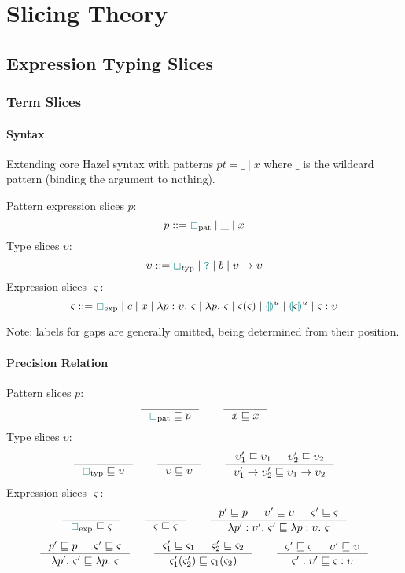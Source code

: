 \chapter{Slicing Theory}
\label{sec:SlicingTheory}
\section{Expression Typing Slices}
\subsection{Term Slices}
\subsubsection{Syntax}
Extending core Hazel syntax with patterns $pt = \_ \mid x$ where $\_$ is the wildcard pattern (binding the argument to nothing).

\begin{definition}
\label{def:ExpressionSliceSyntaxAppendix}
Pattern expression slices $p$:
\[p ::= \gap_{\text{pat}} \mid \_ \mid x\]
Type slices $\upsilon$:
\[\upsilon ::= \gap_{\text{typ}} \mid \dyn \mid b \mid \upsilon \to \upsilon\]
Expression slices $\varsigma$:
\[\varsigma ::= \gap_{\text{exp}} \mid  c \mid x \mid \lambda p : \upsilon.\ \varsigma \mid \lambda p.\ \varsigma \mid \varsigma(\varsigma) \mid \hole^u \mid \hole[\varsigma]^u \mid \varsigma : \upsilon\]
\end{definition}
Note: labels for gaps are generally omitted, being determined from their position.
\subsubsection{Precision Relation}
\begin{definition}
Pattern slices $p$:
\[\inference{}{\gap_{\text{pat}} \sqsubseteq p} \qquad \inference{}{x \sqsubseteq x}\]
Type slices $\upsilon$:
\[\inference{}{\gap_{\text{typ}} \sqsubseteq \upsilon} \qquad \inference{}{\upsilon \sqsubseteq \upsilon} \qquad \inference{\upsilon_1' \sqsubseteq \upsilon_1 & \upsilon_2' \sqsubseteq \upsilon_2}{\upsilon_1' \to \upsilon_2' \sqsubseteq \upsilon_1 \to \upsilon_2}\]
Expression slices $\varsigma$:
\[\inference{}{\gap_{\text{exp}} \sqsubseteq \varsigma} \qquad \inference{}{\varsigma \sqsubseteq \varsigma} \qquad \inference{p' \sqsubseteq p & \upsilon' \sqsubseteq \upsilon & \varsigma' \sqsubseteq \varsigma}{\lambda p' : \upsilon'.\ \varsigma' \sqsubseteq \lambda p : \upsilon.\ \varsigma}\]
\[\inference{p' \sqsubseteq p & \varsigma' \sqsubseteq \varsigma}{\lambda p'.\ \varsigma' \sqsubseteq \lambda p.\ \varsigma} \qquad \inference{\varsigma_1' \sqsubseteq \varsigma_1 & \varsigma_2' \sqsubseteq \varsigma_2}{\varsigma_1'(\varsigma_2') \sqsubseteq \varsigma_1(\varsigma_2)} \qquad \inference{\varsigma' \sqsubseteq \varsigma & \upsilon' \sqsubseteq \upsilon}{\varsigma' : \upsilon' \sqsubseteq \varsigma : \upsilon}\]
\end{definition}


